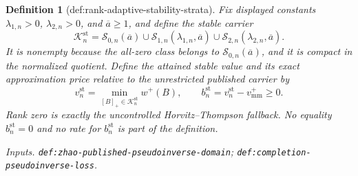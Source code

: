 \documentclass{article}
\newtheorem{definition}{Definition}
\begin{document}
\begin{definition}[def:rank-adaptive-stability-strata]
Fix displayed constants \(\lambda_{1,n}>0\), \(\lambda_{2,n}>0\), and \(\overline a\ge1\), and define the stable carrier
\[
\mathcal K_n^{\mathrm{st}}
=\mathcal S_{0,n}(\overline a)
\cup\mathcal S_{1,n}(\lambda_{1,n},\overline a)
\cup\mathcal S_{2,n}(\lambda_{2,n},\overline a).
\]
It is nonempty because the all-zero class belongs to \(\mathcal S_{0,n}(\overline a)\), and it is compact in the normalized quotient.  Define the attained stable value and its exact approximation price relative to the unrestricted published carrier by
\[
v_n^{\mathrm{st}}
=\min_{[B]_+\in\mathcal K_n^{\mathrm{st}}}w^+(B),
\qquad
b_n^{\mathrm{st}}=v_n^{\mathrm{st}}-v_{\mathrm{mm}}^+\ge0.
\]
Rank zero is exactly the uncontrolled Horvitz--Thompson fallback.  No equality \(b_n^{\mathrm{st}}=0\) and no rate for \(b_n^{\mathrm{st}}\) is part of the definition.
\par\smallskip\noindent\emph{Inputs.} \texttt{def:\allowbreak{}zhao-\allowbreak{}published-\allowbreak{}pseudoinverse-\allowbreak{}domain}; \texttt{def:\allowbreak{}completion-\allowbreak{}pseudoinverse-\allowbreak{}loss}.
\end{definition}
\end{document}
